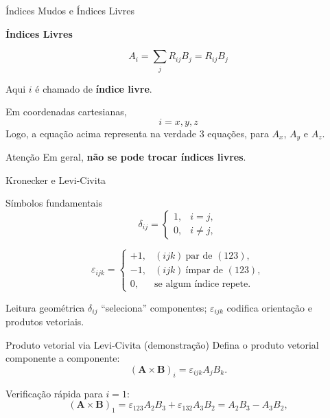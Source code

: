 \documentclass[aspectratio=169]{beamer}
\newcommand{\red}[1]{\textcolor{myred}{#1}}
\begin{document}
\begin{frame}{Índices Mudos e Índices Livres}

\textbf{Índices Livres}

\begin{equation}
A_i = \sum_{j} R_{ij} B_j = R_{ij} B_j
\end{equation}

Aqui \(i\) é chamado de \textbf{índice livre}.

Em coordenadas cartesianas,
\[
i = x, y, z
\]
Logo, a equação acima representa na verdade 3 equações, para $A_x$, $A_y$ e $A_z$.

\begin{alertblock}{Atenção}
Em geral, \textbf{não se pode trocar índices livres}.
\end{alertblock}

\end{frame}
\begin{frame}{Kronecker e Levi-Civita}
\begin{block}{Símbolos fundamentais}
\begin{equation}
\delta_{ij}=
\begin{cases}
1,& i=j,\\
0,& i\neq j,
\end{cases}
\label{eq:kronecker}
\end{equation}

\begin{equation}
\varepsilon_{ijk}=
\begin{cases}
+1,& (ijk)\ \text{par de }(123),\\
-1,& (ijk)\ \text{ímpar de }(123),\\
0,& \text{se algum índice repete.}
\end{cases}
\label{eq:levicivita}
\end{equation}
\end{block}

\begin{alertblock}{Leitura geométrica}
$\delta_{ij}$ ``seleciona'' componentes; $\varepsilon_{ijk}$ codifica orientação e produtos vetoriais.
\end{alertblock}
\end{frame}

\begin{frame}{Produto vetorial via Levi-Civita (demonstração)}
Defina o produto vetorial componente a componente:
\begin{equation}
(\bm A\times \bm B)_i=\varepsilon_{ijk}A_jB_k.
\label{eq:cross_eps}
\end{equation}

\red{Verificação rápida} para $i=1$:
\begin{equation}
(\bm A\times\bm B)_1=\varepsilon_{123}A_2B_3+\varepsilon_{132}A_3B_2
= A_2B_3-A_3B_2,
\label{eq:cross_i1}
\end{equation}

\end{frame}
\end{document}
